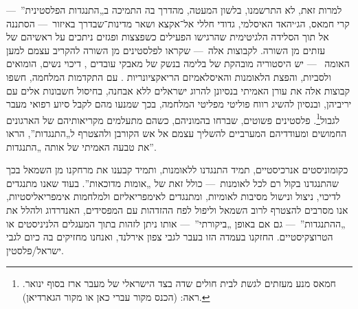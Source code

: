 למרות זאת, לא התרשמנו, בלשון המעטה, מהדרך בה התמיכה ב„התנגדות הפלסטינית”~— קרי חמאס, הג׳יהאד האיסלמי, גדודי חללי אל־אקצא ושאר מדינות־שבדרך  באיזור~— הסתננה אל תוך הסלידה הלגיטימית שהרגישו הפעילים כשפצצות ופגזים ניתכים  על ראשיהם של עזתים מן השורה. לקבוצות אלה~— שקראו לפלסטינים מן השורה להקריב עצמם למען האומה ~— יש היסטוריה מובהקת של בלימה בנשק של מאבקי עובדים , דיכוי נשים, הומואים ולסביות, והפצת הלאומנות והאיסלאמיזם  הריאקציונריות . עם התקדמות המלחמה, חשפו קבוצות אלה את עורן האמיתי בנסיונן להרוג ישראלים ללא אבחנה, בחיסול חשבונות אלים  עם יריביהן, ובנסיון להשיג רווח פוליטי מפליטי המלחמה, בכך שמנעו מהם לקבל סיוע רפואי מעבר לגבול\footnote{חמאס מנע מעזתים  לגשת לבית חולים שדה בצד הישראלי של מעבר ארז בסוף ינואר. ראה: (הכנס מקור עברי כאן או מקור הגארדיאן). \edRemark{***}}. פלסטינים פשוטים, שברחו בהמוניהם, כשהם מתעלמים  מקריאותיהם של הארגונים החמושים ומעודדיהם המערביים להשליך עצמם אל אש הקורבן  ולהצטרף ל„התנגדות”, הראו את טבעה האמיתי של אותה „התנגדות”.

כקומוניסטים אנרכיסטיים, תמיד התנגדנו ללאומנות, ותמיד קבענו את מרחקנו  מן השמאל בכך שהתנגדנו בקול רם  לכל לאומנות~— כולל זאת של „אומות מדוכאות”. בעוד שאנו מתנגדים לדיכוי, ניצול ונישול מסיבות לאומיות, ומתנגדים לאימפריאליזם ולמלחמות אימפריאליסטיות, אנו מסרבים להצטרף לרוב השמאל וליפול לפח ההזדהות עם המפסידים, האנדרדוג ולהלל את „ההתנגדות”~— גם אם באופן „ביקורתי”~— אותו  ניתן לזהות בתוך המעגלים הלניניסטים או הטרוצקיסטיים.  החזקנו בעמדה הזו בעבר לגבי צפון אירלנד, ואנחנו מחזיקים בה כיום לגבי ישראל/פלסטין.

